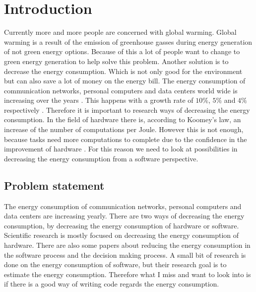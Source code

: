 \chapter{Introduction}
\label{ch:introduction}
Currently more and more people are concerned with global warming. Global warming is a result of the emission of greenhouse gasses during energy generation of not green energy options. Because of this a lot of people want to change to green energy generation to help solve this problem. Another solution is to decrease the energy consumption. Which is not only good for the environment but can also save a lot of money on the energy bill. The energy consumption of communication networks, personal computers and data centers world wide is increasing over the years \cite{van2014trends}. This happens with a growth rate of $10\%$, $5\%$ and $4\%$ respectively \cite{van2014trends}. Therefore it is important to research ways of decreasing the energy consumption. In the field of hardware there is, according to Koomey's law, an increase of the number of computations per Joule. However this is not enough, because tasks need more computations to complete due to the confidence in the improvement of hardware \cite{verdecchia2017estimating}. For this reason we need to look at possibilities in decreasing the energy consumption from a software perspective.


\section{Problem statement}
The energy consumption of communication networks, personal computers and data centers are increasing yearly. There are two ways of decreasing the energy consumption, by decreasing the energy consumption of hardware or software. Scientific research is mostly focused on decreasing the energy consumption of hardware. There are also some papers about reducing the energy consumption in the software process and the decision making process. A small bit of research is done on the energy consumption of software, but their research goal is to estimate the energy consumption. Therefore what I miss and want to look into is if there is a good way of writing code regards the energy consumption.

